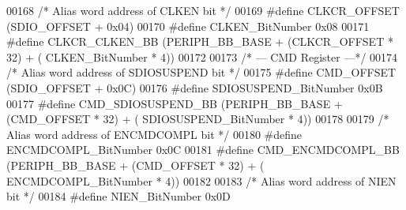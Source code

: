 \begin{DoxyCode}
00168 \textcolor{comment}{/* Alias word address of CLKEN bit */}
00169 \textcolor{preprocessor}{#}\textcolor{preprocessor}{define} \textcolor{preprocessor}{CLKCR\_OFFSET}              \textcolor{preprocessor}{(}SDIO_OFFSET \textcolor{preprocessor}{+} 0x04\textcolor{preprocessor}{)}
00170 \textcolor{preprocessor}{#}\textcolor{preprocessor}{define} \textcolor{preprocessor}{CLKEN\_BitNumber}           0x08
00171 \textcolor{preprocessor}{#}\textcolor{preprocessor}{define} \textcolor{preprocessor}{CLKCR\_CLKEN\_BB}            \textcolor{preprocessor}{(}PERIPH_BB_BASE \textcolor{preprocessor}{+} \textcolor{preprocessor}{(}CLKCR_OFFSET \textcolor{preprocessor}{*} 32\textcolor{preprocessor}{)} \textcolor{preprocessor}{+} \textcolor{preprocessor}{(}
      CLKEN_BitNumber \textcolor{preprocessor}{*} 4\textcolor{preprocessor}{)}\textcolor{preprocessor}{)}
00172 
00173 \textcolor{comment}{/* --- CMD Register ---*/}
00174 \textcolor{comment}{/* Alias word address of SDIOSUSPEND bit */}
00175 \textcolor{preprocessor}{#}\textcolor{preprocessor}{define} \textcolor{preprocessor}{CMD\_OFFSET}                \textcolor{preprocessor}{(}SDIO_OFFSET \textcolor{preprocessor}{+} 0x0C\textcolor{preprocessor}{)}
00176 \textcolor{preprocessor}{#}\textcolor{preprocessor}{define} \textcolor{preprocessor}{SDIOSUSPEND\_BitNumber}     0x0B
00177 \textcolor{preprocessor}{#}\textcolor{preprocessor}{define} \textcolor{preprocessor}{CMD\_SDIOSUSPEND\_BB}        \textcolor{preprocessor}{(}PERIPH_BB_BASE \textcolor{preprocessor}{+} \textcolor{preprocessor}{(}CMD_OFFSET \textcolor{preprocessor}{*} 32\textcolor{preprocessor}{)} \textcolor{preprocessor}{+} \textcolor{preprocessor}{(}
      SDIOSUSPEND_BitNumber \textcolor{preprocessor}{*} 4\textcolor{preprocessor}{)}\textcolor{preprocessor}{)}
00178 
00179 \textcolor{comment}{/* Alias word address of ENCMDCOMPL bit */}
00180 \textcolor{preprocessor}{#}\textcolor{preprocessor}{define} \textcolor{preprocessor}{ENCMDCOMPL\_BitNumber}      0x0C
00181 \textcolor{preprocessor}{#}\textcolor{preprocessor}{define} \textcolor{preprocessor}{CMD\_ENCMDCOMPL\_BB}         \textcolor{preprocessor}{(}PERIPH_BB_BASE \textcolor{preprocessor}{+} \textcolor{preprocessor}{(}CMD_OFFSET \textcolor{preprocessor}{*} 32\textcolor{preprocessor}{)} \textcolor{preprocessor}{+} \textcolor{preprocessor}{(}
      ENCMDCOMPL_BitNumber \textcolor{preprocessor}{*} 4\textcolor{preprocessor}{)}\textcolor{preprocessor}{)}
00182 
00183 \textcolor{comment}{/* Alias word address of NIEN bit */}
00184 \textcolor{preprocessor}{#}\textcolor{preprocessor}{define} \textcolor{preprocessor}{NIEN\_BitNumber}            0x0D

\end{DoxyCode}
